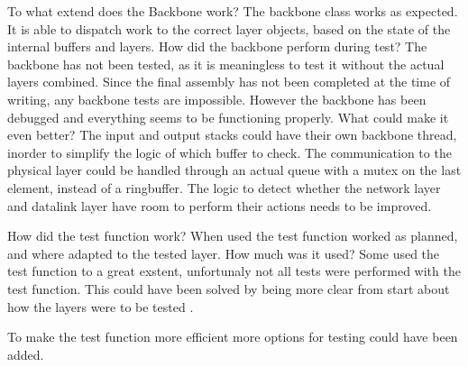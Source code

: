 To what extend does the Backbone work? 
The backbone class works as expected. It is able to dispatch work to the correct layer objects, based on the state of the internal buffers and layers.
How did the backbone perform during test?
The backbone has not been tested, as it is meaningless to test it without the actual layers combined. Since the final assembly has not been completed at the time of writing, any backbone tests are impossible. However the backbone has been debugged and everything seems to be functioning properly.
What could make it even better?
The input and output stacks could have their own backbone thread, inorder to simplify the logic of which buffer to check.
The communication to the physical layer could be handled through an actual queue with a mutex on the last element, instead of a ringbuffer. The logic to detect whether the network layer and datalink layer have room to perform their actions needs to be improved.


How did the test function work?
When used the test function worked as planned, and where adapted to the tested layer. 
How much was it used?
Some used the test function to a great exstent, unfortunaly not all tests were performed with the test function. This could have been solved by being more clear from start about how the layers were to be tested . 

To make the test function more efficient more options for testing could have been added.
